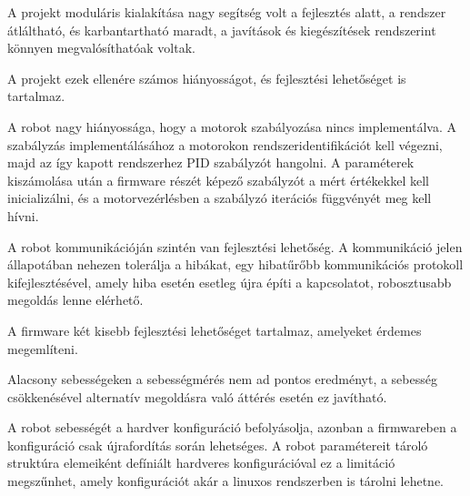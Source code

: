 A projekt moduláris kialakítása nagy segítség volt a fejlesztés alatt, a rendszer
átláltható, és karbantartható maradt, a javítások és kiegészítések rendszerint
könnyen megvalósíthatóak voltak.

\medskip

A projekt ezek ellenére számos hiányosságot, és fejlesztési lehetőséget is
tartalmaz. 

A robot nagy hiányossága, hogy a motorok szabályozása nincs implementálva. A
szabályzás implementálásához a motorokon rendszeridentifikációt kell végezni,
majd az így kapott rendszerhez PID szabályzót hangolni. A paraméterek kiszámolása
után a firmware részét képező szabályzót a mért értékekkel kell inicializálni, és
a motorvezérlésben a szabályzó iterációs függvényét meg kell hívni.

\medskip

A robot kommunikációján szintén van fejlesztési lehetőség. A kommunikáció jelen
állapotában nehezen tolerálja a hibákat, egy hibatűrőbb kommunikációs protokoll
kifejlesztésével, amely hiba esetén esetleg újra építi a kapcsolatot,
robosztusabb megoldás lenne elérhető. 

\medskip

A firmware két kisebb fejlesztési lehetőséget tartalmaz, amelyeket érdemes
megemlíteni.

Alacsony sebességeken a sebességmérés nem ad pontos eredményt, a
sebesség csökkenésével alternatív megoldásra való áttérés esetén ez javítható.

A robot sebességét a hardver konfiguráció befolyásolja, azonban a firmwareben a
konfiguráció csak újrafordítás során lehetséges. A robot paramétereit tároló
struktúra elemeiként defíniált hardveres konfigurációval ez a limitáció
megszűnhet, amely konfigurációt akár a linuxos rendszerben is tárolni lehetne.

